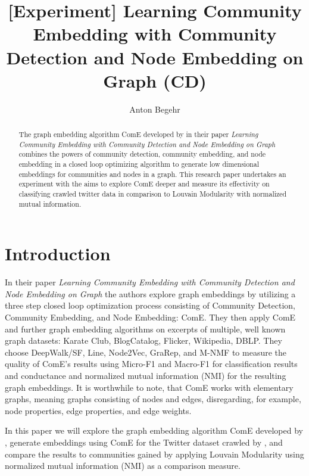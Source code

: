 \documentclass[sigconf, anonymous]{acmart}
\begin{document}
\title{[Experiment] Learning Community Embedding with Community Detection and Node Embedding on Graph (CD)}

\author{Anton Begehr}


\begin{abstract}
  The graph embedding algorithm ComE developed by \citeauthor{Cav17} in their \citeyear{Cav17} paper \textit{Learning Community Embedding with Community Detection and Node Embedding on Graph} combines the powers of community detection, community embedding, and node embedding in a closed loop optimizing algorithm to generate low dimensional embeddings for communities and nodes in a graph. This research paper undertakes an experiment with the aims to explore ComE deeper and measure its effectivity on classifying crawled twitter data in comparison to Louvain Modularity with normalized mutual information.
\end{abstract}


\maketitle

\section{Introduction}

In their \citeyear{Cav17} paper \textit{Learning Community Embedding with Community Detection and Node Embedding on Graph} the authors \citeauthor{Cav17} explore graph embeddings by utilizing a three step closed loop optimization process consisting of Community Detection, Community Embedding, and Node Embedding: ComE.\cite{Cav17} They then apply ComE and further graph embedding algorithms on excerpts of multiple, well known graph datasets: Karate Club, BlogCatalog, Flicker, Wikipedia, DBLP. They choose DeepWalk/SF, Line, Node2Vec, GraRep, and M-NMF to measure the quality of ComE's results using Micro-F1 and Macro-F1 for classification results and conductance and normalized mutual information (NMI) for the resulting graph embeddings. It is worthwhile to note, that ComE works with elementary graphs, meaning graphs consisting of nodes and edges, disregarding, for example, node properties, edge properties, and edge weights.

In this paper we will explore the graph embedding algorithm ComE developed by \citeauthor{Cav17}, generate embeddings using ComE for the Twitter dataset \cite{TwitterData} crawled by \citeauthor{TwitterData}, and compare the results to communities gained by applying Louvain Modularity using normalized mutual information (NMI) as a comparison measure.
\end{document}
